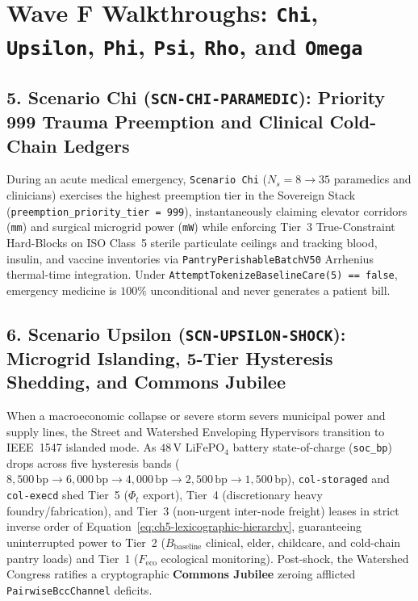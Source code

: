 \section{Wave F Walkthroughs: \texttt{Chi}, \texttt{Upsilon}, \texttt{Phi}, \texttt{Psi}, \texttt{Rho}, and \texttt{Omega}}
\label{sec:ch13-wave-f}

\subsection{5. Scenario Chi (\texttt{SCN-CHI-PARAMEDIC}): Priority 999 Trauma Preemption and Clinical Cold-Chain Ledgers}
During an acute medical emergency, \texttt{Scenario Chi} ($N_s = 8 \to 35$ paramedics and clinicians) exercises the highest preemption tier in the Sovereign Stack (\texttt{preemption\_priority\_tier = 999}), instantaneously claiming elevator corridors (\texttt{mm}) and surgical microgrid power (\texttt{mW}) while enforcing Tier~3 True-Constraint Hard-Blocks on ISO Class~5 sterile particulate ceilings and tracking blood, insulin, and vaccine inventories via \texttt{PantryPerishableBatchV50} Arrhenius thermal-time integration. Under \texttt{AttemptTokenizeBaselineCare(5) == false}, emergency medicine is $100\%$ unconditional and never generates a patient bill.

\subsection{6. Scenario Upsilon (\texttt{SCN-UPSILON-SHOCK}): Microgrid Islanding, 5-Tier Hysteresis Shedding, and Commons Jubilee}
When a macroeconomic collapse or severe storm severs municipal power and supply lines, the Street and Watershed Enveloping Hypervisors transition to IEEE~1547 islanded mode. As $48\,\mathrm{V}$ $\mathrm{LiFePO_4}$ battery state-of-charge (\texttt{soc\_bp}) drops across five hysteresis bands ($8{,}500\,\mathrm{bp} \to 6{,}000\,\mathrm{bp} \to 4{,}000\,\mathrm{bp} \to 2{,}500\,\mathrm{bp} \to 1{,}500\,\mathrm{bp}$), \texttt{col-storaged} and \texttt{col-execd} shed Tier~5 ($\Phi_t$ export), Tier~4 (discretionary heavy foundry/fabrication), and Tier~3 (non-urgent inter-node freight) leases in strict inverse order of Equation~\eqref{eq:ch5-lexicographic-hierarchy}, guaranteeing uninterrupted power to Tier~2 ($B_{\mathrm{baseline}}$ clinical, elder, childcare, and cold-chain pantry loads) and Tier~1 ($F_{\mathrm{eco}}$ ecological monitoring). Post-shock, the Watershed Congress ratifies a cryptographic \textbf{Commons Jubilee} zeroing afflicted \texttt{PairwiseBccChannel} deficits.

